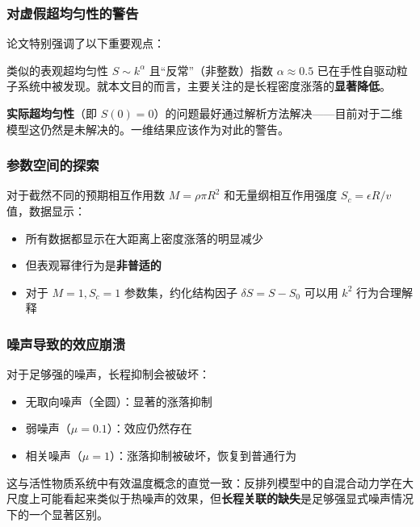 \subsubsection{对虚假超均匀性的警告}

论文特别强调了以下重要观点：

\begin{notebox}[从数值推断超均匀性的风险]
类似的表观超均匀性 $S \sim k^\alpha$ 且``反常''（非整数）指数 $\alpha \approx 0.5$ 已在手性自驱动粒子系统中被发现。就本文目的而言，主要关注的是长程密度涨落的\textbf{显著降低}。

\textbf{实际超均匀性}（即 $S(0) = 0$）的问题最好通过解析方法解决——目前对于二维模型这仍然是未解决的。一维结果应该作为对此的警告。
\end{notebox}

\subsubsection{参数空间的探索}

对于截然不同的预期相互作用数 $M = \rho\pi R^2$ 和无量纲相互作用强度 $S_c = \epsilon R/v$ 值，数据显示：
\begin{itemize}
    \item 所有数据都显示在大距离上密度涨落的明显减少
    \item 但表观幂律行为是\textbf{非普适的}
    \item 对于 $M = 1, S_c = 1$ 参数集，约化结构因子 $\delta S = S - S_0$ 可以用 $k^2$ 行为合理解释
\end{itemize}

\subsubsection{噪声导致的效应崩溃}

对于足够强的噪声，长程抑制会被破坏：
\begin{itemize}
    \item 无取向噪声（全圆）：显著的涨落抑制
    \item 弱噪声（$\mu = 0.1$）：效应仍然存在
    \item 相关噪声（$\mu = 1$）：涨落抑制被破坏，恢复到普通行为
\end{itemize}

这与活性物质系统中有效温度概念的直觉一致：反排列模型中的自混合动力学在大尺度上可能看起来类似于热噪声的效果，但\textbf{长程关联的缺失}是足够强显式噪声情况下的一个显著区别。
